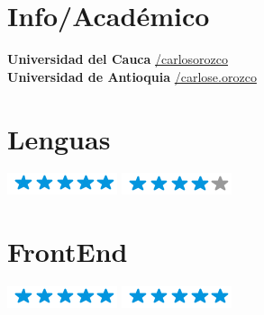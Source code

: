 \documentclass[]{cv-class}
\begin{document}
\begin{aside}
	\section{Info/Académico}
	\textbf{Universidad del Cauca} \href{mailto:carlosorozco@unicauca.edu.co}{/carlosorozco} \\
	\textbf{Universidad de Antioquia}
	\href{mailto:carlose.orozco@udea.edu.co}{/carlose.orozco}

	\section{Lenguas}
	{\includegraphics[scale=0.40]{img/5stars.png}}
	{\includegraphics[scale=0.40]{img/4stars.png}}

	\section{FrontEnd}
	{\includegraphics[scale=0.40]{img/5stars.png}}
	{\includegraphics[scale=0.40]{img/5stars.png}}


\end{aside}
\end{document}
